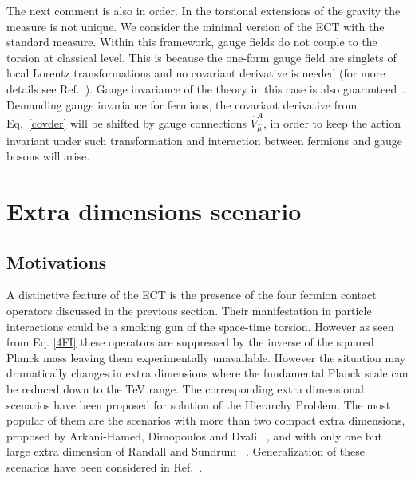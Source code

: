 \documentclass[twocolumn,showpacs,showkeys,prd,superscriptaddress]{revtex4-1}
\begin{document}
The next comment is also in order. In the torsional extensions of the gravity the measure is not unique.
We consider the minimal version of the ECT with the standard measure. Within this framework, gauge fields do not couple to the torsion at classical level. 
This is because the one-form gauge field are singlets of local Lorentz transformations and no covariant derivative is needed (for more details see Ref.~\cite{Benn:1980ea}). Gauge invariance of the theory in this case is also 
guaranteed~\cite{Hehl:1976kj}. 
%
%
Demanding gauge invariance for fermions, the covariant derivative from Eq.~\eqref{covder} will be shifted by gauge connections $\hat{V}_{\hat{\mu}}^A$, in order to keep the action invariant under such transformation and interaction between fermions and gauge bosons will arise.

%
\section{\label{sec:extradim}Extra dimensions scenario}


\subsection{Motivations}

A distinctive feature of the ECT is the presence of the four fermion contact operators discussed in the previous section.  Their manifestation in particle interactions  
could be a smoking gun of the space-time torsion. However as seen from Eq. \eqref{4FI} these operators are  suppressed  by the inverse of the squared Planck 
mass leaving them experimentally unavailable.  However the situation may dramatically changes in extra dimensions where the fundamental Planck scale can be reduced down to the TeV range. The corresponding extra dimensional scenarios have been proposed for solution of the Hierarchy Problem. The most popular of them are the scenarios  with more than two compact extra dimensions, proposed by Arkani-Hamed, Dimopoulos and Dvali 
~\cite{ArkaniHamed:1998rs,Antoniadis:1998ig,ArkaniHamed:1998nn}, and with only one but large extra dimension of Randall and Sundrum
~\cite{Randall:1999ee,Randall:1999vf}. Generalization of these scenarios have been considered in 
Ref.~\cite{DeWolfe:1999cp,Gremm:1999pj,MPS,CastilloFelisola:2004eg}.
\end{document}
